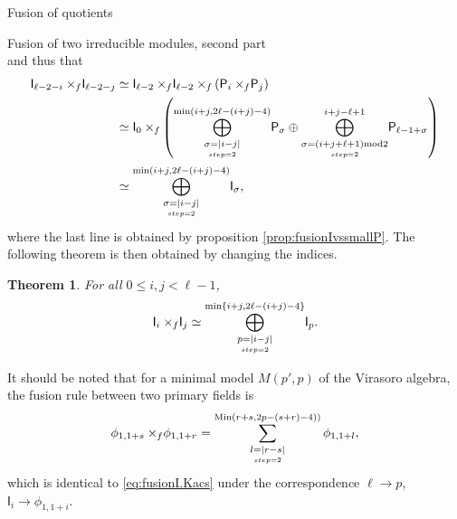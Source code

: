 \documentclass[reqno]{amsart}
\newtheorem{Thm}{Theorem}[section]
\newcommand{\dl}[1]{\mathsf I_{#1}}
\newcommand{\dP}[1]{\mathsf P_{#1}}
\newcommand{\xf}{\times\hspace{-0.27em}_f}
\newcommand{\lc}{\ell}
\begin{document}
\begin{section}{Fusion of quotients}
\begin{subsection}{Fusion of two irreducible modules, second part}
\begin{equation}
\end{equation}
and thus that
\begin{align}
\dl{\lc -2 -i} \xf \dl{\lc -2-j}  & \simeq \dl{\lc-2}\xf\dl{\lc -2} \xf \left( \dP{i} \xf \dP{j} \right)\notag \\
 & \simeq \dl{0}\xf \left(\overset{\min (i+j,2\lc-(i+j)-4)}{\underset{\underset{step=2}{\sigma = |i-j|}}{\bigoplus}}\dP{\sigma} \oplus \overset{i+j -\lc+1}{\underset{\underset{step=2}{\sigma =(i+j+\lc+1)\text{mod} 2 }}{\bigoplus}}\dP{\lc -1 +\sigma} \right)\notag\\
 & \simeq \overset{\min (i+j,2\lc-(i+j)-4)}{\underset{\underset{step=2}{\sigma = |i-j|}}{\bigoplus}}\dl{\sigma},
\end{align}
where the last line is obtained by proposition \ref{prop:fusionIvssmallP}. The following theorem is then obtained by changing the indices.
\begin{Thm}
For all $0\leq i,j <\lc-1$,
\begin{equation}\label{eq:fusionI.Kacs}
\dl{i}\xf\dl{j} \simeq \overset{\min\left\{ i+j, 2\lc -(i+j)-4\right\}}{\underset{\underset{step=2}{p=|i-j|}}{\bigoplus}}\dl{p}.
\end{equation}
\end{Thm}
It should be noted that for a minimal model $M(p',p)$ of the Virasoro algebra, the fusion rule between two primary fields is
\begin{equation}
\phi_{1,1+s} \xf \phi_{1,1+r} = \sum_{\underset{step=2}{l=|r-s|}}^{\text{Min}\left(r+s, 2p -(s+r) - 4) \right)} \phi_{1,1+l},
\end{equation}
which is identical to \eqref{eq:fusionI.Kacs} under the correspondence $\ell \to p$, $\dl{i} \to \phi_{1,1+i}$.
\end{subsection}
\end{section}
\end{document}
